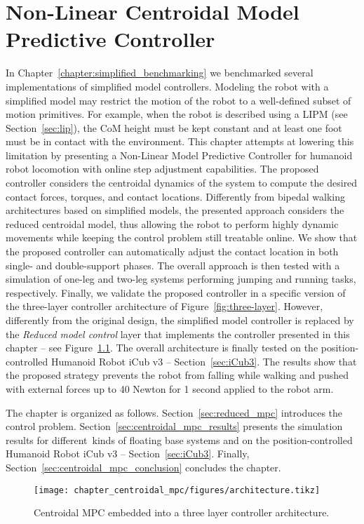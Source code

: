 \chapter{Non-Linear Centroidal Model Predictive Controller \label{chapter:Centroidal_mpc}}
In Chapter~\ref{chapter:simplified_benchmarking} we benchmarked several implementations of simplified model controllers. Modeling the robot with a simplified model may restrict the motion of the robot to a well-defined subset of motion primitives. For example, when the robot is described using a LIPM (see Section~\ref{sec:lip}), the CoM height must be kept constant and at least one foot must be in contact with the environment.
This chapter attempts at lowering this limitation by presenting a Non-Linear Model Predictive Controller for humanoid robot locomotion with online step adjustment capabilities. The proposed controller considers the centroidal dynamics of the system to compute the desired contact forces, torques, and contact locations. Differently from bipedal walking architectures based on simplified models, the presented approach considers the reduced centroidal model, thus allowing the robot to perform highly dynamic movements while keeping the control problem still treatable online. We show that the proposed controller can automatically adjust the contact location in both single- and double-support phases. The overall approach is then tested with a simulation of one-leg and two-leg systems performing jumping and running tasks, respectively. Finally, we validate the proposed controller in a specific version of the three-layer controller architecture of Figure~\ref{fig:three-layer}. However, differently from the original design, the simplified model controller is replaced by the \emph{Reduced model control} layer that implements the controller presented in this chapter -- see Figure~\ref{fig:centroidal_mpc_architecture}.
The overall architecture is finally tested on the position-controlled Humanoid Robot iCub v3 -- Section~\ref{sec:iCub3}. The results show that the proposed strategy prevents the robot from falling while walking and pushed with external forces up to 40 Newton for 1 second applied to the robot arm.
\par
The chapter is organized as follows. Section~\ref{sec:reduced_mpc} introduces the control problem. Section~\ref{sec:centroidal_mpc_results} presents the simulation results for different kinds of floating base systems and on the position-controlled Humanoid Robot iCub v3 -- Section~\ref{sec:iCub3}. Finally, Section~\ref{sec:centroidal_mpc_conclusion} concludes the chapter.
\par
\begin{figure}[t]
    \centering
    \texttt{[image: chapter\_centroidal\_mpc/figures/architecture.tikz]}
    \caption[Centroidal MPC embedded into a three layer controller architecture]{Centroidal MPC embedded into a three layer controller architecture.}
    \label{fig:centroidal_mpc_architecture}
\end{figure}

